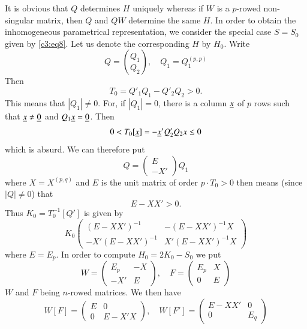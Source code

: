 It is obvious that $Q$ determines $H$ uniquely whereas if $W$ is a
$p$-rowed non-singular matrix, then $Q$ and $QW$ determine the same
$H$. In order to obtain the inhomogeneous parametrical representation,
we consider the special case $S=S_{0}$ given by \eqref{c3:eq8}.
Let us denote the corresponding $H$ by $H_{0}$. Write
\begin{equation*}
Q=\binom{Q_{1}}{Q_{2}},\quad Q_{1}=Q_{1}^{(p,p)}\tag{24}\label{c3:eq24}
\end{equation*}
Then 
$$
T_{0}=Q'_{1}Q_{1}-Q'_{2}Q_{2}>0.
$$
This means that $|Q_{1}|\neq 0$. For, if $|Q_{1}|=0$, there is a
column $\underline{x}$ of $p$ rows such that $\underline{x}\neq \underline{0}$ and
$Q_{1}\underline{x}=\underline{0}$. Then 
$$
0<T_{0}[\underline{x}]=-\underline{x}'Q'_{2}Q_{2}x\leq 0
$$
which is absurd. We can therefore put 
\begin{equation*}
Q=
\begin{pmatrix}
E\\
-X'
\end{pmatrix}
Q_{1}\tag{25}\label{c3:eq25}
\end{equation*}\pageoriginale
where $X=X^{(p,q)}$ and $E$ is the unit matrix of order $p\cdot
T_{0}>0$ then means (since $|Q|\neq 0$) that 
\begin{equation*}
E-XX'>0.\tag{26}\label{c3:eq26}
\end{equation*}
Thus $K_{0}=T^{-1}_{0}[Q']$ is given by
\begin{equation*}
K_{0}
\begin{pmatrix}
(E-XX')^{-1} & -(E-XX')^{-1}X\\
-X'(E-XX')^{-1} & X'(E-XX')^{-1}X
\end{pmatrix}\tag{27}\label{c3:eq27}
\end{equation*}
where $E=E_{p}$. In order to compute $H_{0}=2K_{0}-S_{0}$ we put
$$
W=
\begin{pmatrix}
E_{p} & -X\\
-X' & E
\end{pmatrix},\quad
F=
\begin{pmatrix}
E_{p} & X\\
0 & E
\end{pmatrix}
$$
$W$ and $F$ being $n$-rowed matrices. We then have
\begin{equation*}
W[F]=
\begin{pmatrix}
E & 0\\
0 & E-X'X
\end{pmatrix},\quad
W[F']=
\begin{pmatrix}
E-XX' & 0\\
0 & E_{q}
\end{pmatrix}\tag{28}\label{c3:eq28}
\end{equation*}

